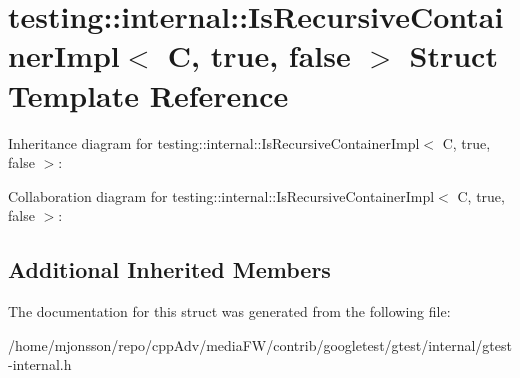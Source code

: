 \hypertarget{structtesting_1_1internal_1_1IsRecursiveContainerImpl_3_01C_00_01true_00_01false_01_4}{}\section{testing\+:\+:internal\+:\+:Is\+Recursive\+Container\+Impl$<$ C, true, false $>$ Struct Template Reference}
\label{structtesting_1_1internal_1_1IsRecursiveContainerImpl_3_01C_00_01true_00_01false_01_4}


Inheritance diagram for testing\+:\+:internal\+:\+:Is\+Recursive\+Container\+Impl$<$ C, true, false $>$\+:


Collaboration diagram for testing\+:\+:internal\+:\+:Is\+Recursive\+Container\+Impl$<$ C, true, false $>$\+:
\subsection*{Additional Inherited Members}


The documentation for this struct was generated from the following file\+:\begin{DoxyCompactItemize}
\item 
/home/mjonsson/repo/cpp\+Adv/media\+F\+W/contrib/googletest/gtest/internal/gtest-\/internal.\+h\end{DoxyCompactItemize}
